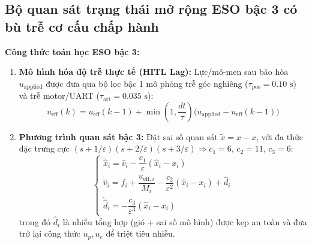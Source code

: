 \documentclass[11pt,a4paper]{article}
\begin{document}
\subsection{Bộ quan sát trạng thái mở rộng ESO bậc 3 có bù trễ cơ cấu chấp hành}
\noindent
\begin{minipage}[t]{0.45\textwidth}
\vspace{0pt}
\textbf{Công thức toán học ESO bậc 3:}
\begin{enumerate}[leftmargin=1.3em, itemsep=0.25em]
    \item \textbf{Mô hình hóa độ trễ thực tế (HITL Lag):} Lực/mô-men sau bão hòa $u_{\text{applied}}$ được đưa qua bộ lọc bậc 1 mô phỏng trễ góc nghiêng ($\tau_{\text{pos}} = 0.10\text{ s}$) và trễ motor/UART ($\tau_{\text{att}} = 0.035\text{ s}$):
    \[
    u_{\text{eff}}(k) = u_{\text{eff}}(k-1) + \min\!\left(1, \frac{dt}{\tau}\right)\big(u_{\text{applied}} - u_{\text{eff}}(k-1)\big)
    \]
    \item \textbf{Phương trình quan sát bậc 3:} Đặt sai số quan sát $\tilde{x} = \hat{x} - x$, với đa thức đặc trưng cực $(s + 1/\varepsilon)(s + 2/\varepsilon)(s + 3/\varepsilon) \Rightarrow c_1=6,\, c_2=11,\, c_3=6$:
    \[
    \begin{cases}
        \dot{\hat{x}}_i = \hat{v}_i - \dfrac{c_1}{\varepsilon}(\hat{x}_i - x_i) \\[6pt]
        \dot{\hat{v}}_i = f_i + \dfrac{u_{\text{eff},i}}{M_i} - \dfrac{c_2}{\varepsilon^2}(\hat{x}_i - x_i) + \hat{d}_i \\[6pt]
        \dot{\hat{d}}_i = -\dfrac{c_3}{\varepsilon^3}(\hat{x}_i - x_i)
    \end{cases}
    \]
    trong đó $\hat{d}_i$ là nhiễu tổng hợp (gió + sai số mô hình) được kẹp an toàn và đưa trở lại công thức $u_p, u_e$ để triệt tiêu nhiễu.
\end{enumerate}
\end{minipage}
\hfill
\end{document}
